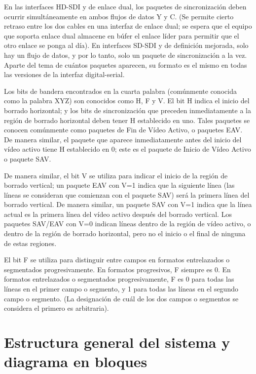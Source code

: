   En las interfaces HD-SDI y de enlace dual, los paquetes de sincronización deben ocurrir
  simultáneamente en ambos flujos de datos Y y C. (Se permite cierto retraso entre los dos cables
  en una interfaz de enlace dual; se espera que el equipo que soporta enlace dual almacene en
  búfer el enlace líder para permitir que el otro enlace se ponga al día). En interfaces SD-SDI y
  de definición mejorada, solo hay un flujo de datos, y por lo tanto, solo un paquete de
  sincronización a la vez. Aparte del tema de cuántos paquetes aparecen, su formato es el mismo en
  todas las versiones de la interfaz digital-serial.

  Los bits de bandera encontrados en la cuarta palabra (comúnmente conocida como la palabra XYZ)
  son conocidos como H, F y V. El bit H indica el inicio del borrado horizontal; y los bits de
  sincronización que preceden inmediatamente a la región de borrado horizontal deben tener H
  establecido en uno. Tales paquetes se conocen comúnmente como paquetes de Fin de Vídeo Activo, o
  paquetes EAV\@. De manera similar, el paquete que aparece inmediatamente antes del inicio del vídeo
  activo tiene H establecido en 0; este es el paquete de Inicio de Vídeo Activo o paquete SAV\@.

  De manera similar, el bit V se utiliza para indicar el inicio de la región de borrado vertical; un
  paquete EAV con V=1 indica que la siguiente línea (las líneas se consideran que comienzan con el
  paquete SAV) será la primera línea del borrado vertical. De manera similar, un paquete SAV con V=1
  indica que la línea actual es la primera línea del vídeo activo después del borrado vertical. Los
  paquetes SAV/EAV con V=0 indican líneas dentro de la región de vídeo activo, o dentro de la región
  de borrado horizontal, pero no el inicio o el final de ninguna de estas regiones.

  El bit F se utiliza para distinguir entre campos en formatos entrelazados o segmentados
  progresivamente. En formatos progresivos, F siempre es 0. En formatos entrelazados o segmentados
  progresivamente, F es 0 para todas las líneas en el primer campo o segmento, y 1 para todas las
  líneas en el segundo campo o segmento. (La designación de cuál de los dos campos o segmentos se
  considera el primero es arbitraria).

\section{Estructura general del sistema y diagrama en bloques}


